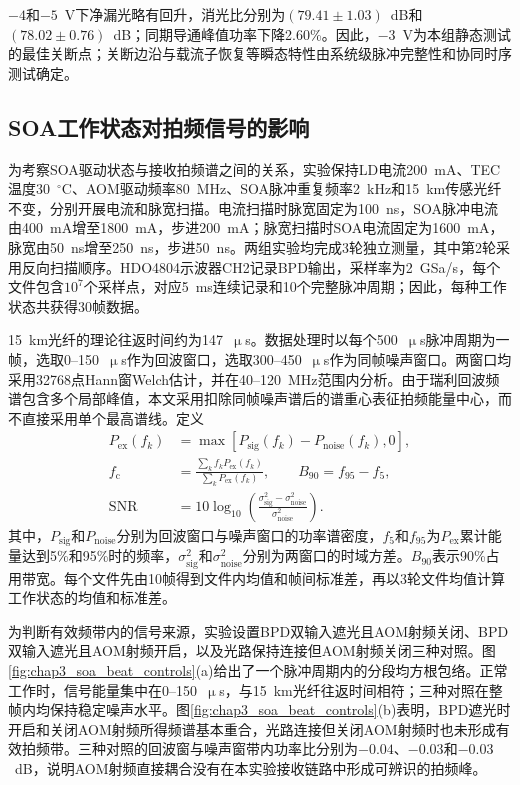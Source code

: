 $-4$和$-5$~V下净漏光略有回升，消光比分别为$(79.41\pm1.03)$~dB和$(78.02\pm0.76)$~dB；同期导通峰值功率下降2.60\%。因此，$-3$~V为本组静态测试的最佳关断点；关断边沿与载流子恢复等瞬态特性由系统级脉冲完整性和协同时序测试确定。

\subsection{SOA工作状态对拍频信号的影响}

为考察SOA驱动状态与接收拍频谱之间的关系，实验保持LD电流200~mA、TEC温度30~$^\circ$C、AOM驱动频率80~MHz、SOA脉冲重复频率2~kHz和15~km传感光纤不变，分别开展电流和脉宽扫描。电流扫描时脉宽固定为100~ns，SOA脉冲电流由400~mA增至1800~mA，步进200~mA；脉宽扫描时SOA电流固定为1600~mA，脉宽由50~ns增至250~ns，步进50~ns。两组实验均完成3轮独立测量，其中第2轮采用反向扫描顺序。HDO4804示波器CH2记录BPD输出，采样率为2~GSa/s，每个文件包含$10^7$个采样点，对应5~ms连续记录和10个完整脉冲周期；因此，每种工作状态共获得30帧数据。

15~km光纤的理论往返时间约为147~$\upmu$s。数据处理时以每个500~$\upmu$s脉冲周期为一帧，选取0--150~$\upmu$s作为回波窗口，选取300--450~$\upmu$s作为同帧噪声窗口。两窗口均采用32768点Hann窗Welch估计，并在40--120~MHz范围内分析。由于瑞利回波频谱包含多个局部峰值，本文采用扣除同帧噪声谱后的谱重心表征拍频能量中心，而不直接采用单个最高谱线。定义
\begin{equation}
  \begin{aligned}
    P_{\mathrm{ex}}(f_k)&=\max\!\left[P_{\mathrm{sig}}(f_k)-P_{\mathrm{noise}}(f_k),0\right],\\
    f_{\mathrm{c}}&=\frac{\sum_k f_kP_{\mathrm{ex}}(f_k)}{\sum_k P_{\mathrm{ex}}(f_k)},\qquad
    B_{90}=f_{95}-f_{5},\\
    \mathrm{SNR}&=10\log_{10}\!\left(
    \frac{\sigma_{\mathrm{sig}}^2-\sigma_{\mathrm{noise}}^2}
    {\sigma_{\mathrm{noise}}^2}\right).
  \end{aligned}
  \label{eq:soa_beat_metrics}
\end{equation}
其中，$P_{\mathrm{sig}}$和$P_{\mathrm{noise}}$分别为回波窗口与噪声窗口的功率谱密度，$f_5$和$f_{95}$为$P_{\mathrm{ex}}$累计能量达到5\%和95\%时的频率，$\sigma_{\mathrm{sig}}^2$和$\sigma_{\mathrm{noise}}^2$分别为两窗口的时域方差。$B_{90}$表示90\%占用带宽。每个文件先由10帧得到文件内均值和帧间标准差，再以3轮文件均值计算工作状态的均值和标准差。

为判断有效频带内的信号来源，实验设置BPD双输入遮光且AOM射频关闭、BPD双输入遮光且AOM射频开启，以及光路保持连接但AOM射频关闭三种对照。图\ref{fig:chap3_soa_beat_controls}(a)给出了一个脉冲周期内的分段均方根包络。正常工作时，信号能量集中在0--150~$\upmu$s，与15~km光纤往返时间相符；三种对照在整帧内均保持稳定噪声水平。图\ref{fig:chap3_soa_beat_controls}(b)表明，BPD遮光时开启和关闭AOM射频所得频谱基本重合，光路连接但关闭AOM射频时也未形成有效拍频带。三种对照的回波窗与噪声窗带内功率比分别为$-0.04$、$-0.03$和$-0.03$~dB，说明AOM射频直接耦合没有在本实验接收链路中形成可辨识的拍频峰。

